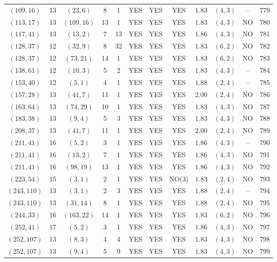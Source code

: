 \begin{longtable}{|c|c|c|c|c|c|c|c|c|c|c|c|}
$(109,16)$ & 13 & $(23,6)$ & 8 & 1 & YES & YES & YES & $1.83$ & $(4,3)$ & -- & 779\\
$(113,17)$ & 13 & $(109,16)$ & 13 & 1 & YES & YES & YES & $1.83$ & $(4,3)$ & NO & 780\\
$(117,41)$ & 13 & $(13,2)$ & 7 & 13 & YES & YES & YES & $1.86$ & $(4,3)$ & NO & 781\\
$(128,37)$ & 12 & $(32,9)$ & 8 & 32 & YES & YES & YES & $1.83$ & $(6,2)$ & NO & 782\\
$(128,37)$ & 12 & $(73,21)$ & 14 & 1 & YES & YES & YES & $1.83$ & $(6,2)$ & NO & 783\\
$(138,61)$ & 12 & $(10,3)$ & 5 & 2 & YES & YES & YES & $1.83$ & $(4,3)$ & -- & 784\\
$(153,40)$ & 12 & $(5,1)$ & 4 & 1 & YES & YES & YES & $1.88$ & $(2,4)$ & -- & 785\\
$(157,28)$ & 13 & $(41,7)$ & 11 & 1 & YES & YES & YES & $2.00$ & $(2,4)$ & NO & 786\\
$(163,64)$ & 13 & $(74,29)$ & 10 & 1 & YES & YES & YES & $1.83$ & $(4,3)$ & NO & 787\\
$(183,38)$ & 13 & $(9,4)$ & 5 & 3 & YES & YES & YES & $1.83$ & $(4,3)$ & NO & 788\\
$(208,37)$ & 13 & $(41,7)$ & 11 & 1 & YES & YES & YES & $2.00$ & $(2,4)$ & NO & 789\\
$(211,41)$ & 16 & $(5,2)$ & 3 & 1 & YES & YES & YES & $1.86$ & $(4,3)$ & -- & 790\\
$(211,41)$ & 16 & $(13,2)$ & 7 & 1 & YES & YES & YES & $1.86$ & $(4,3)$ & NO & 791\\
$(211,41)$ & 16 & $(98,19)$ & 13 & 1 & YES & YES & YES & $1.86$ & $(4,3)$ & NO & 792\\
$(223,54)$ & 15 & $(3,1)$ & 2 & 1 & YES & YES & NO(3) & $1.83$ & $(2,4)$ & NO & 793\\
$(243,110)$ & 13 & $(3,1)$ & 2 & 3 & YES & YES & YES & $1.88$ & $(2,4)$ & -- & 794\\
$(243,110)$ & 13 & $(31,14)$ & 8 & 1 & YES & YES & YES & $1.88$ & $(2,4)$ & NO & 795\\
$(244,33)$ & 16 & $(163,22)$ & 14 & 1 & YES & YES & YES & $1.83$ & $(6,2)$ & NO & 796\\
$(252,41)$ & 17 & $(5,2)$ & 3 & 1 & YES & YES & YES & $1.86$ & $(4,3)$ & NO & 797\\
$(252,107)$ & 13 & $(8,3)$ & 4 & 4 & YES & YES & YES & $1.83$ & $(4,3)$ & NO & 798\\
$(252,107)$ & 13 & $(9,4)$ & 5 & 9 & YES & YES & YES & $1.83$ & $(4,3)$ & NO & 799\\

\end{longtable}
